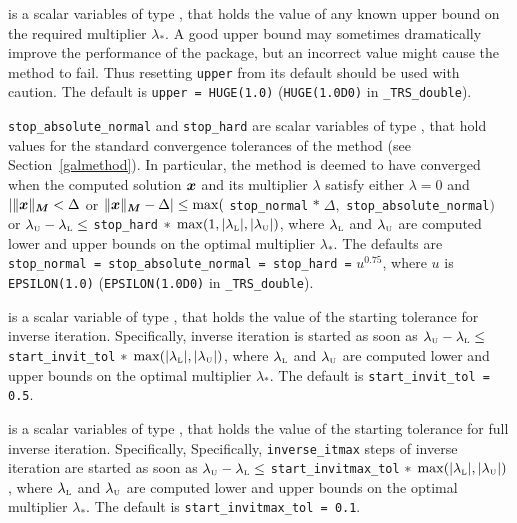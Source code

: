 \documentclass{galahad}
\newcommand{\packagename}{TRS}
\newcommand{\fullpackagename}{\libraryname\_\packagename}
\begin{document}
\begin{description}
 is a scalar variables of type \realdp, that holds the value
of any known upper bound on the required multiplier $\lambda_*$. A good upper
bound may sometimes dramatically improve the performance of the package, but
an incorrect value might cause the method to fail. Thus resetting
{\tt upper} from its default should be used with caution.
The default is {\tt upper = HUGE(1.0)}
({\tt HUGE(1.0D0)} in {\tt \fullpackagename\_double}).

 {\tt stop\_absolute\_normal}
and {\tt stop\_hard} are scalar variables of type \realdp,
that hold values for the standard convergence tolerances of the method
(see Section~\ref{galmethod}).
In particular, the method is deemed to have converged when the
computed solution ${\bm{x}}$ and its multiplier $\lambda$ satisfy either
$\lambda = 0$ and $|\|{\bm{x}}\|_{{\bm{M}}} < \Delta$ or
$\|{\bm{x}}\|_{{\bm{M}}} -  \Delta| \leq \max($ {\tt stop\_normal} $\ast \; \Delta,$
{\tt stop\_absolute\_normal}$)$ or
$\lambda_{\mbox{\protect\tiny U}} - \lambda_{\mbox{\protect\tiny L}}
\leq$ {\tt stop\_hard} $\ast \; \max( 1, | \lambda_{\mbox{\protect\tiny L}} |,
| \lambda_{\mbox{\protect\tiny U}} | )$, where
$\lambda_{\mbox{\protect\tiny L}}$ and
$\lambda_{\mbox{\protect\tiny U}}$ are computed lower and upper bounds
on the optimal multiplier $\lambda_*$.
The defaults are {\tt stop\_normal = \tt stop\_absolute\_normal = stop\_hard =}
$u^{0.75}$,
where $u$ is {\tt EPSILON(1.0)} ({\tt EPSILON(1.0D0)} in
{\tt \fullpackagename\_double}).

 is a scalar variable of type \realdp, that holds the
value of the starting tolerance for inverse iteration.
Specifically, inverse iteration is started as soon as
$\lambda_{\mbox{\protect\tiny U}} - \lambda_{\mbox{\protect\tiny L}}
\leq$ {\tt start\_invit\_tol} $\ast \;
 \max( | \lambda_{\mbox{\protect\tiny L}} |,
 | \lambda_{\mbox{\protect\tiny U}} | )$, where
$\lambda_{\mbox{\protect\tiny L}}$ and
$\lambda_{\mbox{\protect\tiny U}}$ are computed lower and upper bounds
on the optimal multiplier $\lambda_*$.
The default is {\tt start\_invit\_tol = 0.5}.

 is a scalar variables of type \realdp, that holds the
value of the starting tolerance for full inverse iteration. Specifically,
Specifically, {\tt inverse\_itmax} steps of inverse iteration are
started as soon as
$\lambda_{\mbox{\protect\tiny U}} - \lambda_{\mbox{\protect\tiny L}}
\leq$ {\tt start\_invitmax\_tol} $\ast \;
 \max( | \lambda_{\mbox{\protect\tiny L}} |,
 | \lambda_{\mbox{\protect\tiny U}} | )$, where
$\lambda_{\mbox{\protect\tiny L}}$ and
$\lambda_{\mbox{\protect\tiny U}}$ are computed lower and upper bounds
on the optimal multiplier $\lambda_*$.
The default is {\tt start\_invitmax\_tol = 0.1}.


\end{description}
\end{document}
